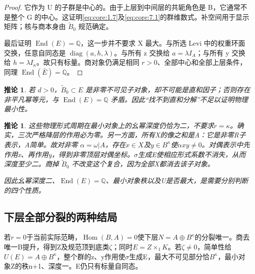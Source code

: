 \documentclass[11pt,a4paper,oneside]{ctexrep}
\theoremstyle{cnplain}
\newtheorem{corollary}[theorem]{推论}
\theoremstyle{definition}
\theoremstyle{remark}
\begin{document}
\begin{proof}
它作为 U 的子群是中心的。由于上层到中间层的共轭角色是 B，它通常不是整个 G 的中心。这证明\eqref{eq:core:1.7}及\eqref{eq:core:7.1}的群维数式。补空间用于显示矩阵；核与商本身由 \(\widetilde B_0\) 规范确定。

最后证明 \(\operatorname{End}(E)=\mathbb Q\)，这一步并不要求 X 最大。与所选 Levi 中的权重环面交换，任意自同态是 \(\operatorname{diag}(a,h,\lambda )\)。与所有 z 交换给 \(a=\lambda I_A\)；与所有 y 交换给 \(h=\lambda I_\kappa \)。故只有标量。商对象仍满足相同 \(r>0\)、全部中心和全部上层条件，同理 \(\operatorname{End}(\bar E)=\mathbb Q\)。

\end{proof}

\begin{corollary}

\label{thm:core:7.2} 若 \(d>0\)，\(\widetilde B_0\subset E\) 是非零不可见子对象，却不可能是直和因子；否则存在非平凡幂等元，与 \(\operatorname{End}(E)=\mathbb Q\) 矛盾。因此``找不到直和分解''不足以证明物理最小性。

\end{corollary}

\begin{corollary}

\label{thm:core:7.3} 这些物理形式周期在最小对象上的幺幂深度仍恰为二，不要求\(r=\kappa \)。确实，三次严格降层的作用必为零。另一方面，所有X的像之和是A：它是非零R子表示，A简单。故对非零 \(\alpha=\omega|A\)，存在\(x\in X\)及\(y\in B^\kappa \)使\(\alpha xy\ne 0\)。对偶表示中先作用x、再作用y，得到非零顶层对偶坐标。\(\sigma \)生成E使相应形式系数不消失，从而深度至少二。商掉 \(\widetilde B_0\) 不改变这个复合，因为全部X都消去该子对象。

因此幺幂深度二、\(\operatorname{End}(E)=\mathbb Q\)、最小对象秩以及U是否最大，是需要分别判断的四个性质。

\end{corollary}

\subsection{下层全部分裂的两种结局}\label{sec:core:7.4}

若\(r=0\)于当前实际范畴，\(\operatorname{Hom}(B,A)=0\)使下层\(N=A\oplus B^\kappa \)的分裂唯一。商去唯一B提升，得到Z及规范顶到底类\(\zeta \)；同时\(E=Z\times _{1}K\)。若\(\zeta \ne 0\)，简单性给\(U(E)=A\oplus B^\kappa \)，整个群的z、y作用使\(\sigma \)生成E，最大不可见部分恰\(B^\kappa \)，最小对象Z的秩n+1、深度一。E仍只有标量自同态。
\end{document}
